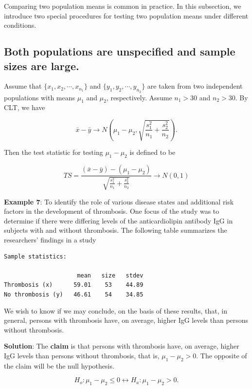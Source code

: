 \documentclass[
]{book}
\begin{document}
Comparing two population means is common in practice. In this subsection, we introduce two special procedures for testing two population means under different conditions.

\hypertarget{both-populations-are-unspecified-and-sample-sizes-are-large.}{%
\subsection{Both populations are unspecified and sample sizes are large.}\label{both-populations-are-unspecified-and-sample-sizes-are-large.}}

Assume that \(\{ x_1, x_2, \cdots, x_{n_1}\}\) and \(\{ y_1, y_2, \cdots, y_{n_2}\}\) are taken from two independent populations with means \(\mu_1\) and \(\mu_2\), respectively. Assume \(n_1 > 30\) and \(n_2 > 30\). By CLT, we have

\[
\bar{x}-\bar{y} \to N\left(\mu_1-\mu_2, \sqrt{\frac{s_1^2}{n_1}+\frac{s_2^2}{n_2}}\right).
\]

Then the test statistic for testing \(\mu_1-\mu_2\) is defined to be

\[
TS = \frac{(\bar{x}-\bar{y}) -(\mu_1-\mu_2)}{\sqrt{\frac{s_1^2}{n_1}+\frac{s_2^2}{n_2}}} \to N(0, 1)
\]

\textbf{Example 7}: To identify the role of various disease states and additional risk factors in the development of thrombosis. One focus of the study was to determine if there were differing levels of the anticardiolipin antibody IgG in subjects with and without thrombosis. The following table summarizes the researchers' findings in a study

\begin{verbatim}
Sample statistics:

                     mean   size   stdev
Thrombosis (x)      59.01    53    44.89
No thrombosis (y)   46.61    54    34.85
\end{verbatim}

We wish to know if we may conclude, on the basis of these results, that, in general, persons with thrombosis have, on average, higher IgG levels than persons without thrombosis.

\textbf{Solution}: The \textbf{claim} is that persons with thrombosis have, on average, higher IgG levels than persons without thrombosis, that is, \(\mu_1 - \mu_2 > 0\). The opposite of the claim will be the null hypothesis.

\[
H_o: \mu_1 - \mu_2 \le 0 \leftrightarrow  H_a: \mu_1 - \mu_2 > 0 .
\]
\end{document}
